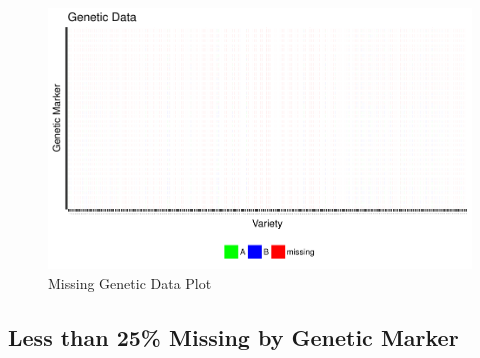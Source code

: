 \documentclass[11pt]{article}\usepackage[]{graphicx}\usepackage[]{color}
\makeatletter
\def\maxwidth{ %
  \ifdim\Gin@nat@width>\linewidth
    \linewidth
  \else
    \Gin@nat@width
  \fi
}
\newenvironment{knitrout}{}{} %
\makeatother
\begin{document}
\begin{knitrout}\footnotesize
{}\color{fgcolor}\begin{figure}[H]

{\centering \includegraphics[width=\maxwidth]{figure/missing_plot-1} 

}

\caption[Missing Genetic Data Plot]{Missing Genetic Data Plot}\label{fig:missing.plot}
\end{figure}


\end{knitrout}


\pagebreak

\subsection{Less than 25\% Missing by Genetic Marker}
\end{document}
